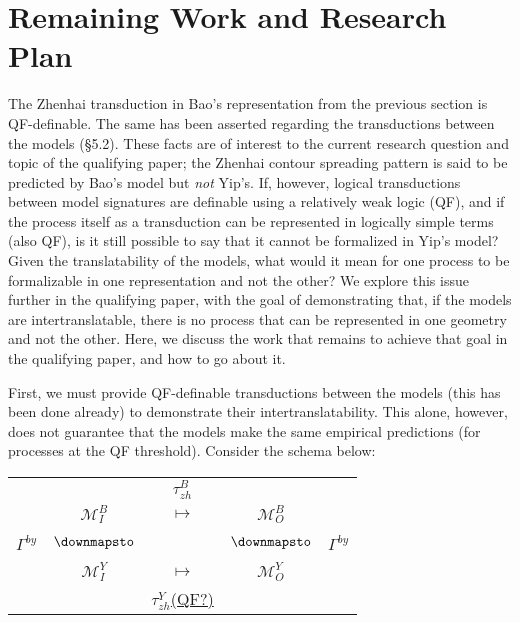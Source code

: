 \documentclass{article}
\begin{document}
\section{Remaining Work and Research Plan}
The Zhenhai transduction in Bao's representation from the previous section is QF-definable. The same has been asserted regarding the transductions between the models (\S5.2). These facts are of interest to the current research question and topic of the qualifying paper; the Zhenhai contour spreading pattern is said to be predicted by Bao's model but \emph{not} Yip's. If, however, logical transductions between model signatures are definable using a relatively weak logic (QF), and if the process itself as a transduction can be represented in logically simple terms (also QF), is it still possible to say that it cannot be formalized in Yip's model? Given the translatability of the models, what would it mean for one process to be formalizable in one representation and not the other? We explore this issue further in the qualifying paper, with the goal of demonstrating that, if the models are intertranslatable, there is no process that can be represented in one geometry and not the other. Here, we discuss the work that remains to achieve that goal in the qualifying paper, and how to go about it.\par
First, we must provide QF-definable transductions between the models (this has been done already) to demonstrate their intertranslatability. This alone, however, does not guarantee that the models make the same empirical predictions (for processes at the QF threshold). Consider the schema below:
\begin{center}
\begin{tabular}{ccccc}
& & {\small$\tau^{B}_{zh}$} \\
& $\mathcal{M}^{B}_{I}$ & {\Large$\mapsto$} & $\mathcal{M}^{B}_{O}$ \\
\hspace{1em} \\
{\small$\Gamma^{by}$} & {\Large$\downmapsto$} & & {\Large$\downmapsto$} & {\small$\Gamma^{by}$} \\ 
\hspace{1em} \\
& $\mathcal{M}^{Y}_{I}$ & {\Large$\mapsto$} & $\mathcal{M}^{Y}_{O}$ \\
& & {\small\underline{$\tau^{Y}_{zh}$(QF?)}} \\
\end{tabular}
\end{center}
\end{document}
